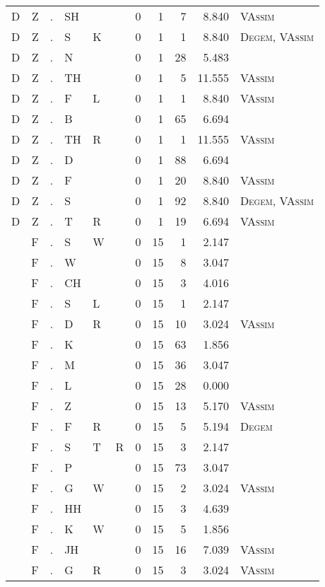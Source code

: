 \begin{longtable}{r@{ } r@{ } c@{ } l@{ } l@{ } l@{ } r r r r l }
D & Z & . & SH &  &  & 0 & 1 & 7 & 8.840 & \textsc{VAssim} \\
D & Z & . & S & K &  & 0 & 1 & 1 & 8.840 & \textsc{Degem}, \textsc{VAssim} \\
D & Z & . & N &  &  & 0 & 1 & 28 & 5.483 &  \\
D & Z & . & TH &  &  & 0 & 1 & 5 & 11.555 & \textsc{VAssim} \\
D & Z & . & F & L &  & 0 & 1 & 1 & 8.840 & \textsc{VAssim} \\
D & Z & . & B &  &  & 0 & 1 & 65 & 6.694 &  \\
D & Z & . & TH & R &  & 0 & 1 & 1 & 11.555 & \textsc{VAssim} \\
D & Z & . & D &  &  & 0 & 1 & 88 & 6.694 &  \\
D & Z & . & F &  &  & 0 & 1 & 20 & 8.840 & \textsc{VAssim} \\
D & Z & . & S &  &  & 0 & 1 & 92 & 8.840 & \textsc{Degem}, \textsc{VAssim} \\
D & Z & . & T & R &  & 0 & 1 & 19 & 6.694 & \textsc{VAssim} \\
 & F & . & S & W &  & 0 & 15 & 1 & 2.147 &  \\
 & F & . & W &  &  & 0 & 15 & 8 & 3.047 &  \\
 & F & . & CH &  &  & 0 & 15 & 3 & 4.016 &  \\
 & F & . & S & L &  & 0 & 15 & 1 & 2.147 &  \\
 & F & . & D & R &  & 0 & 15 & 10 & 3.024 & \textsc{VAssim} \\
 & F & . & K &  &  & 0 & 15 & 63 & 1.856 &  \\
 & F & . & M &  &  & 0 & 15 & 36 & 3.047 &  \\
 & F & . & L &  &  & 0 & 15 & 28 & 0.000 &  \\
 & F & . & Z &  &  & 0 & 15 & 13 & 5.170 & \textsc{VAssim} \\
 & F & . & F & R &  & 0 & 15 & 5 & 5.194 & \textsc{Degem} \\
 & F & . & S & T & R & 0 & 15 & 3 & 2.147 &  \\
 & F & . & P &  &  & 0 & 15 & 73 & 3.047 &  \\
 & F & . & G & W &  & 0 & 15 & 2 & 3.024 & \textsc{VAssim} \\
 & F & . & HH &  &  & 0 & 15 & 3 & 4.639 &  \\
 & F & . & K & W &  & 0 & 15 & 5 & 1.856 &  \\
 & F & . & JH &  &  & 0 & 15 & 16 & 7.039 & \textsc{VAssim} \\
 & F & . & G & R &  & 0 & 15 & 3 & 3.024 & \textsc{VAssim} \\

\end{longtable}
